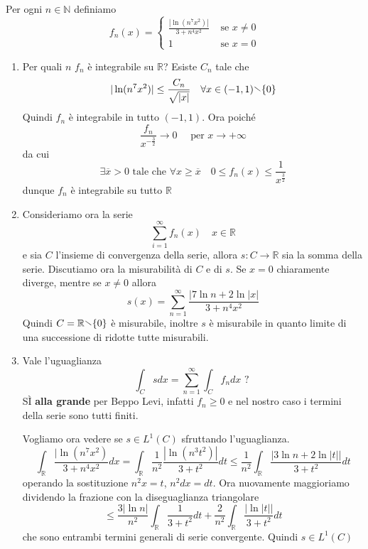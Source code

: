\begin{eser}
    Per ogni \(n \in \mathbb{N}\) definiamo \[f_{n}(x) =
        \begin{cases}
            \displaystyle
        \frac{|\ln (n^{7} x^2)|}{3 + n^{4}x^2} & \text{ se } x \neq 0 \\
        1 & \text{ se } x = 0
\end{cases}
\]
\begin{enumerate}[label = \alph*)]
    \item Per quali \(n\) \(f_{n}\) è integrabile su \(\mathbb{R}\)? 
        Esiste \(C_{n}\) tale che 
        \[
            |\ln (n^{7} x^2)| \le \frac{C_{n}}{\sqrt{ |x| }} \quad \forall x \in
            (-1, 1) \sminus \{0\}
        \]
        Quindi \(f_{n}\) è integrabile in tutto \((-1, 1)\).
        Ora poiché
        \[
            \frac{f_{n}}{x^{-\frac{3}{2}}} \to 0 \quad \text{ per } x \to +\infty
        \]
        da cui
        \[
            \exists  \overline{x} > 0 \text{ tale che } \forall x \ge
            \overline{x} \quad 0\le f_{n}(x) \le \frac{1}{x^{\frac{3}{2}}}
        \]
        dunque \(f_{n}\) è integrabile su tutto \(\mathbb{R}\) 
    \item Consideriamo ora la serie
        \[
            \sum_{i=1}^{\infty} f_{n}(x) \quad x \in \mathbb{R}
        \]
        e sia \(C\) l'insieme di convergenza della serie, allora \(s: C \to
        \mathbb{R}\) sia la somma della serie. Discutiamo ora la misurabilità di
        \(C\) e di \(s\).
        Se \(x = 0\) chiaramente diverge, mentre se \(x \neq 0\) allora
        \[
            s(x) = \sum_{n=1}^{\infty} \frac{|7 \ln n + 2 \ln|x|}{3 + n^{4}x^2} 
        \]
        Quindi \(C = \mathbb{R} \sminus \{0\} \) è misurabile, inoltre \(s\) è
        misurabile in quanto limite di una successione di ridotte tutte
        misurabili.
    \item Vale l'uguaglianza 
        \[
            \int_{C}  s dx = \sum_{n=1}^{\infty} \int_{C} f_{n} dx  \text{ ? }
        \]
        SÌ \textbf{alla grande} per Beppo Levi, infatti \(f_{n} \ge 0\) e nel nostro caso
        i termini della serie sono tutti finiti.

        Vogliamo ora vedere se \(s \in L^{1} (C)\) sfruttando l'uguaglianza.
        \[
            \int_{\mathbb{R}} \frac{|\ln(n^{7}x ^2)}{3 + n^{4}x^2} dx =
            \int_{\mathbb{R}} \frac{1}{n^2} \frac{|\ln(n^3 t^2)|}{ 3 + t^2 } dt
            \le \frac{1}{n^2} \int_{\mathbb{R}} \frac{|3 \ln n + 2 \ln |t||}{ 3 +
            t^2} dt
        \]
        operando la sostituzione \(n^2x = t\), \(n^2 dx = dt\). Ora nuovamente
        maggioriamo dividendo la frazione con la diseguaglianza triangolare
        \[
            \le \frac{3 |\ln n|}{ n^2 } \int_{\mathbb{R}} \frac{1}{3 + t^2} dt +
            \frac{2}{n^2} \int_{\mathbb{R}} \frac{|\ln |t||}{3 + t^2} dt
        \]
        che sono entrambi termini generali di serie convergente. Quindi \(s \in
        L^{1}(C)\)

\end{enumerate}
\end{eser}

